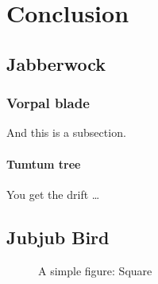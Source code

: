 %

\chapter{Conclusion}
\section{Jabberwock}
\subsection{Vorpal blade}
And this is a subsection.
	
\subsubsection{Tumtum tree}
You get the drift \ldots
		
\section{Jubjub Bird}

\begin{figure}[htbp]			%
\begin{center}
\caption{A simple figure: Square}	%
\label{circle}
\end{center}
\end{figure}

